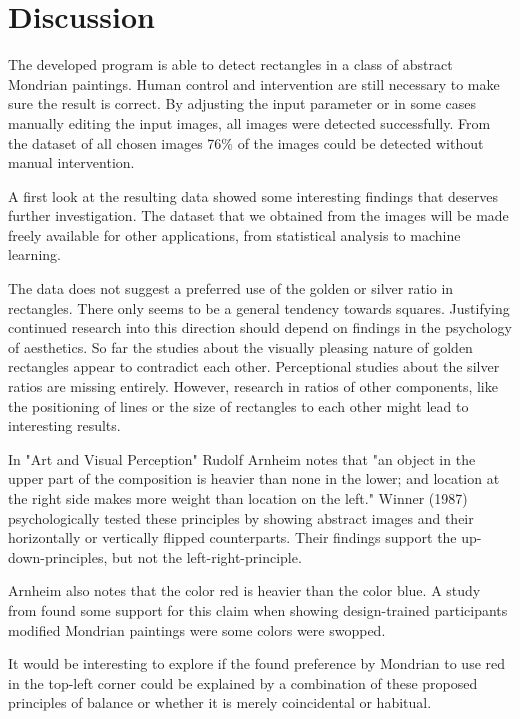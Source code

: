 \documentclass[serif,article,noparskip]{agse-thesis}
\begin{document}
\section{Discussion} \label{conclusion}

The developed program is able to detect rectangles in a class of abstract
Mondrian paintings. Human control and intervention are still necessary to make
sure the result is correct. By adjusting the input parameter or in some cases
manually editing the input images, all images were detected successfully. From
the dataset of all chosen images 76\% of the images could be detected without
manual intervention.

A first look at the resulting data showed some interesting findings that deserves
further investigation. The dataset that we obtained from the images will be made
freely available for other applications, from statistical analysis to machine
learning.

The data does not suggest a preferred use of the golden or silver ratio in
rectangles. There only seems to be a general tendency towards squares.
Justifying continued research into this direction should depend on findings in
the psychology of aesthetics. So far the studies about the visually pleasing
nature of golden rectangles appear to contradict each other. Perceptional
studies about the silver ratios are missing entirely. However, research in  ratios
of other components, like the positioning of lines or the size of rectangles to
each other might lead to interesting results.

In "Art and Visual Perception" Rudolf Arnheim \cite{Arnheim1965} notes that "an
object in the upper part of the composition is heavier than none in the lower;
and location at the right side makes more weight than location on the left."
Winner (1987) \cite{Winner1987} psychologically tested these principles by
showing abstract images and their horizontally or vertically flipped
counterparts. Their findings support the up-down-principles, but not the
left-right-principle.

Arnheim also notes that the color red is heavier than the color blue. A study
from \cite{Locher2005} found some support for this claim when showing
design-trained participants modified Mondrian paintings were some colors were
swopped.

It would be interesting to explore if the found preference by Mondrian to use
red in the top-left corner could be explained by a combination of these proposed
principles of balance or whether it is merely coincidental or habitual.
\end{document}
